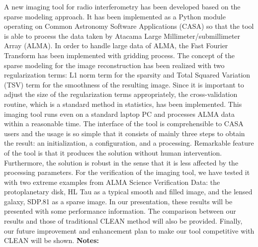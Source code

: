 \documentclass{report}
\begin{document}
{{{{{{{{{{{{{{{{{{{{{{{{{{{{{{{{{{{{{{{{{{{{{{{{{{{{{{{{{{{{{{{{{{{{{{{{{{{{{{{{{{{{{{{{{{{{{{{{{{{{{{{{{{{{{{{{{{{{{{{{{{{{{{{{{{{{{{{A new imaging tool for radio interferometry has been developed based on the sparse modeling approach. It has been implemented as a Python module operating on Common Astronomy Software Applications (CASA) so that the tool is able to process the data taken by Atacama Large Millimeter/submillimeter Array (ALMA). In order to handle large data of ALMA, the Fast Fourier Transform has been implemented with gridding process. The concept of the sparse modeling for the image reconstruction has been realized with two regularization terms: L1 norm term for the sparsity and Total Squared Variation (TSV) term for the smoothness of the resulting image. Since it is important to adjust the size of the regularization terms appropriately, the cross-validation routine, which is a standard method in statistics, has been implemented. This imaging tool runs even on a standard laptop PC and processes ALMA data within a reasonable time. The interface of the tool is comprehensible to CASA users and the usage is so simple that it consists of mainly three steps to obtain the result: an initialization, a configuration, and a processing. Remarkable feature of the tool is that it produces the solution without human intervention. Furthermore, the solution is robust in the sense that it is less affected by the processing parameters. For the verification of the imaging tool, we have tested it with two extreme examples from ALMA Science Verification Data: the protoplanetary disk, HL Tau as a typical smooth and filled image, and the lensed galaxy, SDP.81 as a sparse image. In our presentation, these results will be presented with some performance information. The comparison between our results and those of traditional CLEAN method will also be provided. Finally, our future improvement and enhancement plan to make our tool competitive with CLEAN will be shown.\newline
{\bf Notes:}\newline
{\newpage
}}}}}}}}}}}}}}}}}}}}}}}}}}}}}}}}}}}}}}}}}}}}}}}}}}}}}}}}}}}}}}}}}}}}}}}}}}}}}}}}}}}}}}}}}}}}}}}}}}}}}}}}}}}}}}}}}}}}}}}}}}}}}}}}}}}}}}}}
\end{document}
